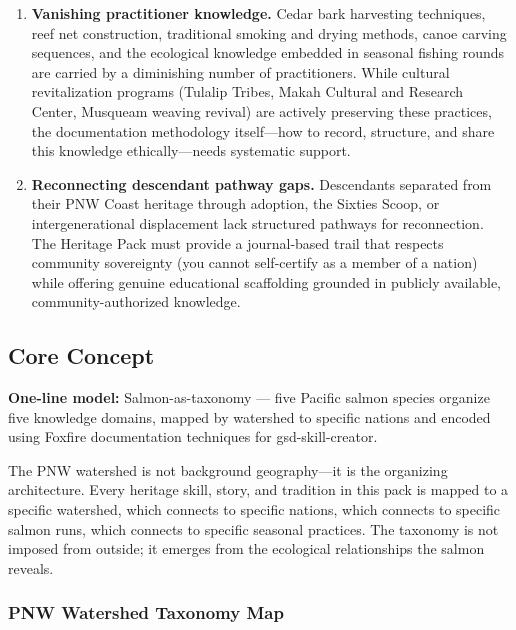 \documentclass[11pt,letterpaper]{article}
\begin{document}
\begin{enumerate}[leftmargin=2em]
\item \textbf{Vanishing practitioner knowledge.} Cedar bark harvesting techniques, reef net construction, traditional smoking and drying methods, canoe carving sequences, and the ecological knowledge embedded in seasonal fishing rounds are carried by a diminishing number of practitioners. While cultural revitalization programs (Tulalip Tribes, Makah Cultural and Research Center, Musqueam weaving revival) are actively preserving these practices, the documentation methodology itself---how to record, structure, and share this knowledge ethically---needs systematic support.

\item \textbf{Reconnecting descendant pathway gaps.} Descendants separated from their PNW Coast heritage through adoption, the Sixties Scoop, or intergenerational displacement lack structured pathways for reconnection. The Heritage Pack must provide a journal-based trail that respects community sovereignty (you cannot self-certify as a member of a nation) while offering genuine educational scaffolding grounded in publicly available, community-authorized knowledge.
\end{enumerate}

\subsection{Core Concept}

\textbf{One-line model:} Salmon-as-taxonomy --- five Pacific salmon species organize five knowledge domains, mapped by watershed to specific nations and encoded using Foxfire documentation techniques for gsd-skill-creator.

The PNW watershed is not background geography---it is the organizing architecture. Every heritage skill, story, and tradition in this pack is mapped to a specific watershed, which connects to specific nations, which connects to specific salmon runs, which connects to specific seasonal practices. The taxonomy is not imposed from outside; it emerges from the ecological relationships the salmon reveals.

\subsubsection{PNW Watershed Taxonomy Map}
\end{document}
